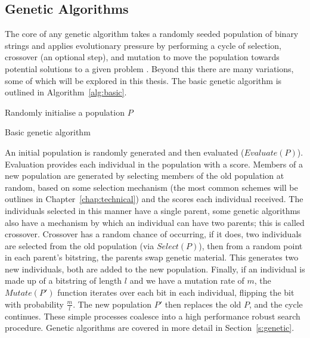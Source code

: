\subsection{Genetic Algorithms}
The core of any genetic algorithm takes a randomly seeded population of binary strings
and applies
evolutionary pressure by performing a cycle of selection, crossover (an optional
step), and mutation
to move the population towards potential solutions to a given problem \cite{Goldberg:1989:GAS:534133}.
Beyond this there are many
variations, some of which will be explored in this thesis. The basic genetic algorithm is
outlined in Algorithm~\ref{alg:basic}.

\begin{algorithm}
	Randomly initialise a population $P$\\
	\caption{Basic genetic algorithm}
	\label{alg:basic}
\end{algorithm}

An initial population is randomly generated and then
evaluated ($Evaluate(P)$). Evaluation provides each individual in the population with a score.
Members of a new population are generated by selecting members of the old population
at random, based on some selection mechanism (the most common schemes will be outlines
in Chapter~\ref{chap:technical}) and the scores each individual received. The individuals
selected in this manner have a single parent, some genetic algorithms also have a mechanism
by which an individual can have two parents; this is called crossover. Crossover has a
random chance of occurring, if it does, two individuals are selected from the old
population (via $Select(P)$), then from a random point in each parent's bitstring, the
parents swap
genetic material. This generates two new individuals, both are added to the
new population.
Finally, if an individual is made up of a bitstring of length $l$ and we have a mutation rate
of $m$, the $Mutate(P')$ function iterates over each bit in each individual, flipping the bit with
probability $\frac{m}{l}$. The new population $P'$ then replaces the old $P$, and the cycle continues.
These simple processes coalesce into a high performance robust search
procedure. Genetic algorithms are covered in more detail in Section~\ref{s:genetic}.

